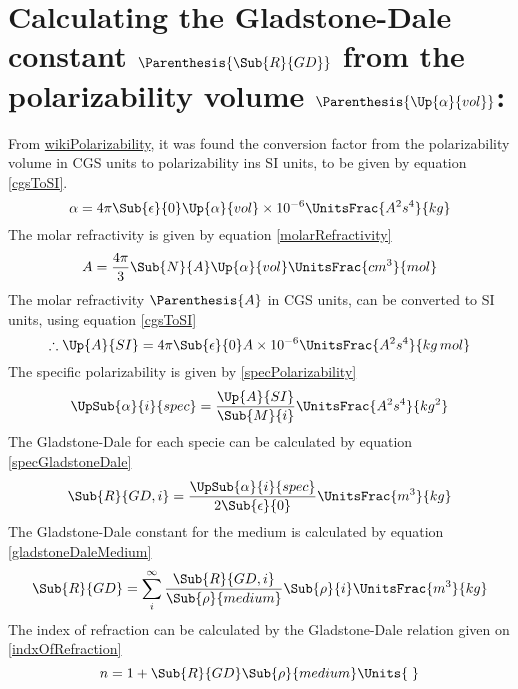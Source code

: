     \section{Calculating the Gladstone-Dale constant $\Parenthesis{\Sub{R}{GD}}$ from the polarizability volume $\Parenthesis{\Up{\alpha}{vol}}$:}
    \indent From \href{https://en.wikipedia.org/wiki/Polarizability}{wikiPolarizability}, it was found the conversion factor from the polarizability volume in CGS units to polarizability ins SI units, to be given by equation \eqref{cgsToSI}. 
    \begin{equation}\label{cgsToSI}
        \alpha = 4\pi\Sub{\epsilon}{0}\Up{\alpha}{vol}\times10^{-6}\UnitsFrac{A^2s^4}{kg} 
    \end{equation}
    \indent The molar refractivity is given by equation \eqref{molarRefractivity} 
    \begin{equation}\label{molarRefractivity}
        A = \frac{4\pi}{3}\Sub{N}{A}\Up{\alpha}{vol}\UnitsFrac{cm^3}{mol} 
    \end{equation}
    \indent The molar refractivity $\Parenthesis{A}$ in CGS units, can be converted to SI units, using equation \eqref{cgsToSI}
    $$ \therefore \Up{A}{SI} = 4\pi\Sub{\epsilon}{0}A\times 10^{-6}\UnitsFrac{A^2s^4}{kg\,mol} $$
    \indent The specific polarizability is given by \eqref{specPolarizability}
    \begin{equation}\label{specPolarizability}
        \UpSub{\alpha}{i}{spec} = \frac{\Up{A}{SI}}{\Sub{M}{i}}\UnitsFrac{A^2s^4}{kg^2}
    \end{equation}
    \indent The Gladstone-Dale for each specie can be calculated by equation \eqref{specGladstoneDale}
    \begin{equation}\label{specGladstoneDale}
        \Sub{R}{GD,i} = \frac{\UpSub{\alpha}{i}{spec}}{2\Sub{\epsilon}{0}}\UnitsFrac{m^3}{kg}
    \end{equation}
    \indent The Gladstone-Dale constant for the medium is calculated by equation \eqref{gladstoneDaleMedium}
    \begin{equation}\label{gladstoneDaleMedium}
        \Sub{R}{GD} = \sum_{i}^{\infty}\frac{\Sub{R}{GD,i}}{\Sub{\rho}{medium}}\Sub{\rho}{i}\UnitsFrac{m^3}{kg} 
    \end{equation}
    \indent The index of refraction can be calculated by the Gladstone-Dale relation given on \eqref{indxOfRefraction}
    \begin{equation}\label{indxOfRefraction}
        n = 1 + \Sub{R}{GD}\Sub{\rho}{medium}\Units{\;}
    \end{equation}


